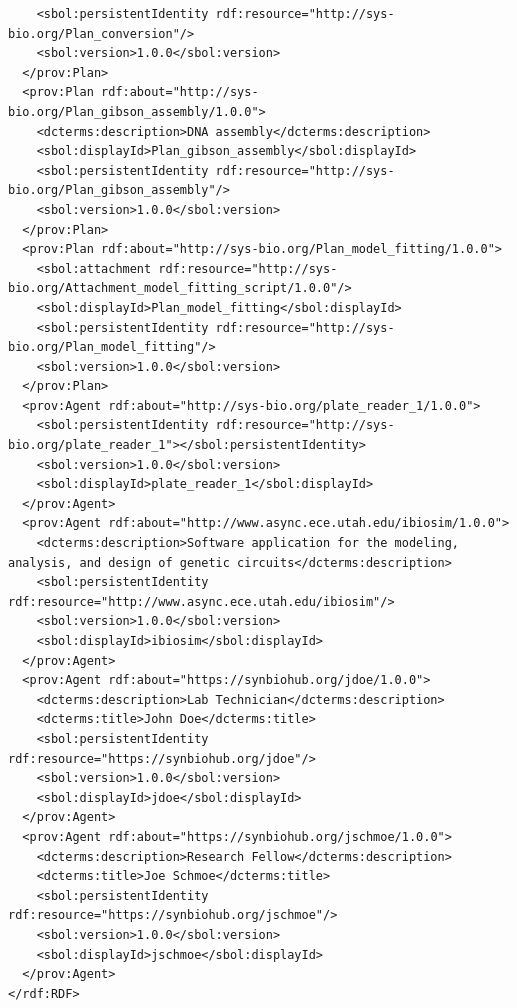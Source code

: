 \begin{lstlisting}
    <sbol:persistentIdentity rdf:resource="http://sys-bio.org/Plan_conversion"/>
    <sbol:version>1.0.0</sbol:version>
  </prov:Plan>
  <prov:Plan rdf:about="http://sys-bio.org/Plan_gibson_assembly/1.0.0">
    <dcterms:description>DNA assembly</dcterms:description>
    <sbol:displayId>Plan_gibson_assembly</sbol:displayId>
    <sbol:persistentIdentity rdf:resource="http://sys-bio.org/Plan_gibson_assembly"/>
    <sbol:version>1.0.0</sbol:version>
  </prov:Plan>
  <prov:Plan rdf:about="http://sys-bio.org/Plan_model_fitting/1.0.0">
    <sbol:attachment rdf:resource="http://sys-bio.org/Attachment_model_fitting_script/1.0.0"/>
    <sbol:displayId>Plan_model_fitting</sbol:displayId>
    <sbol:persistentIdentity rdf:resource="http://sys-bio.org/Plan_model_fitting"/>
    <sbol:version>1.0.0</sbol:version>
  </prov:Plan>
  <prov:Agent rdf:about="http://sys-bio.org/plate_reader_1/1.0.0">
    <sbol:persistentIdentity rdf:resource="http://sys-bio.org/plate_reader_1"></sbol:persistentIdentity>
    <sbol:version>1.0.0</sbol:version>
    <sbol:displayId>plate_reader_1</sbol:displayId>
  </prov:Agent>
  <prov:Agent rdf:about="http://www.async.ece.utah.edu/ibiosim/1.0.0">
    <dcterms:description>Software application for the modeling, analysis, and design of genetic circuits</dcterms:description>
    <sbol:persistentIdentity rdf:resource="http://www.async.ece.utah.edu/ibiosim"/>
    <sbol:version>1.0.0</sbol:version>
    <sbol:displayId>ibiosim</sbol:displayId>
  </prov:Agent>
  <prov:Agent rdf:about="https://synbiohub.org/jdoe/1.0.0">
    <dcterms:description>Lab Technician</dcterms:description>
    <dcterms:title>John Doe</dcterms:title>
    <sbol:persistentIdentity rdf:resource="https://synbiohub.org/jdoe"/>
    <sbol:version>1.0.0</sbol:version>
    <sbol:displayId>jdoe</sbol:displayId>
  </prov:Agent>
  <prov:Agent rdf:about="https://synbiohub.org/jschmoe/1.0.0">
    <dcterms:description>Research Fellow</dcterms:description>
    <dcterms:title>Joe Schmoe</dcterms:title>
    <sbol:persistentIdentity rdf:resource="https://synbiohub.org/jschmoe"/>
    <sbol:version>1.0.0</sbol:version>
    <sbol:displayId>jschmoe</sbol:displayId>
  </prov:Agent>
</rdf:RDF>
\end{lstlisting}

